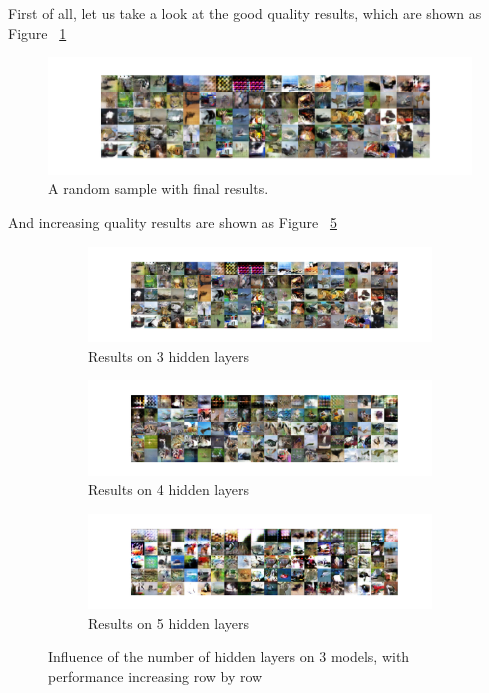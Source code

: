 \documentclass[12pt,letterpaper]{article}
\begin{document}
First of all, let us take a look at the good quality results, which are shown as Figure ~\ref{fig:CIFAR_GAN_hidden_results} 
\begin{figure}[h]
    \centering
    \includegraphics[width=.8\linewidth]{GAN_CIFAR_0_50_256.png}
    \caption{\small A random sample with final results.}
    \label{fig:CIFAR_GAN_hidden_results}
\end{figure}

And increasing quality results are shown as Figure ~\ref{fig:CIFAR_GAN_hidden}
\begin{figure}[h]
    \begin{subfigure}{0.49\textwidth}
    \includegraphics[width=\linewidth]{GAN_CIFAR_0_50_256.png}
    \caption{\small Results on 3 hidden layers} \label{fig:a}
    \end{subfigure}\hspace*{\fill}
    \begin{subfigure}{0.49\textwidth}
    \includegraphics[width=\linewidth]{GAN_CIFAR_1_50_256.png}
    \caption{\small Results on 4 hidden layers} \label{fig:b}
    \end{subfigure}

    \medskip
    \begin{subfigure}{0.49\textwidth}
    \includegraphics[width=\linewidth]{GAN_CIFAR_2_50_256.png}
    \caption{\small Results on 5 hidden layers} \label{fig:c}
    \end{subfigure}\hspace*{\fill}
    \caption{Influence of the number of hidden layers on $3$ models, with performance increasing row by row} \label{fig:CIFAR_GAN_hidden}
\end{figure}
\end{document}

